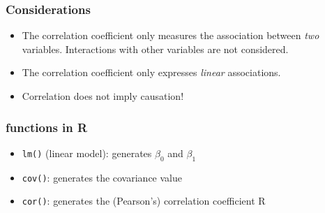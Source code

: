 \documentclass{beamer}
\begin{document}
\begin{frame}
  \frametitle{Considerations}
  
  \begin{itemize}
    \item The correlation coefficient only measures the association between \emph{two} variables. Interactions with other variables are not considered.
    \item The correlation coefficient only expresses \emph{linear} associations.
    \item Correlation does not imply causation!
  \end{itemize}
\end{frame}

\begin{frame}
\frametitle{functions in R}

\begin{itemize}
    \item \texttt{lm()} (linear model): generates $\beta_0$ and $\beta_1$
    \item \texttt{cov()}: generates the covariance value
    \item \texttt{cor()}: generates the (Pearson's) correlation coefficient R
\end{itemize}
\end{frame}

\end{document}
